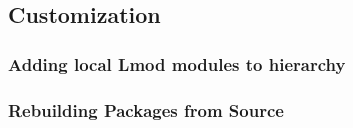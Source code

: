 \clearpage

\subsection{Customization} \label{appendix:customization}

\subsubsection{Adding local Lmod modules to \OHPC{} hierarchy} \label{appendix:modulefiles}


\newpage
\subsubsection{Rebuilding Packages from Source}  \label{appendix:rpmbuild}

